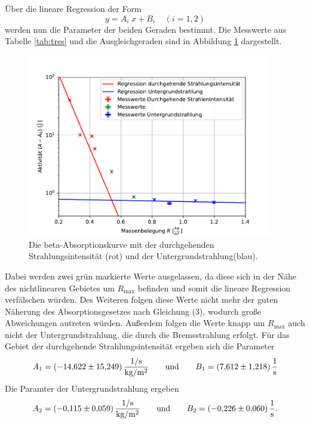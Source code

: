 Über die lineare Regression der Form
\begin{equation}
  y = A_i \; x + B_i \;\;\;\; (i = 1,2)
\end{equation} werden nun die Parameter der beiden Geraden bestimmt.
Die Messwerte aus Tabelle \ref{tab:tres} und die Ausgleichgeraden sind in Abbildung \ref{fig:Beta} dargestellt.
\begin{figure}[h]
  \centering
  \includegraphics[height=8cm]{Auswertung/BetaKurve.pdf}
  \caption{Die beta-Absorptionskurve mit der durchgehenden Strahlungsintensität (rot) und der Untergrundstrahlung(blau).}
  \label{fig:Beta}
\end{figure}
Dabei werden zwei grün markierte Werte ausgelassen, da diese sich in der Nähe des nichtlinearen Gebietes um $R_\text{max}$ befinden und somit die lineare Regression verfälschen würden.
Des Weiteren folgen diese Werte nicht mehr der guten Näherung des Absorptionsgesetzes nach Gleichung (3), wodurch große Abweichungen autreten würden.
Außerdem folgen die Werte knapp um $R_\text{max}$ auch nicht der Untergrundstrahlung, die durch die Bremsstrahlung erfolgt.
Für das Gebiet der durchgehende Strahlungsintensität ergeben sich die Parameter
\begin{equation}
  A_1 = \SI{-14.622 \pm 15.249}{\frac{1/s}{kg/m^2}} \qquad \text{und} \qquad B_1 = \SI{7.612 \pm 1.218}{\frac{1}{s}} \notag
\end{equation}
Die Paramter der Untergrundstrahlung ergeben
\begin{equation}
  A_2 = \SI{-0.115 \pm 0.059}{\frac{1/s}{kg/m^2}} \qquad \text{und} \qquad B_2 = \SI{-0.226 \pm 0.060}{\frac{1}{s}}.  \notag
\end{equation}

